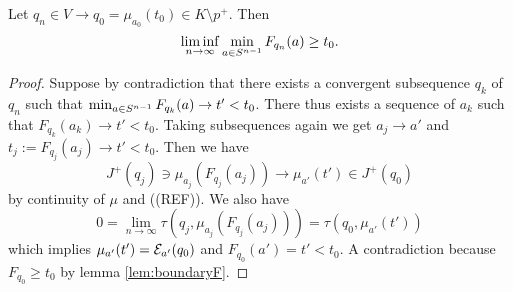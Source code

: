\begin{lemma}
    Let $q_n\in V\to q_0=\mu_{a_0}(t_0)\in K\setminus p^+$. Then 
    \[
        \liminf_{n\to \infty} \min_{a \in {S^{n-1}}} F_{q_n}(a) \ge t_0.
    \]
\end{lemma}
\begin{proof}
    Suppose by contradiction that there exists a convergent subsequence $q_k$ of $q_n$ such that $\min_{a \in {S^{n-1}}} F_{q_k}(a)\to t'<t_0$. There thus exists a sequence of $a_k$ such that $F_{q_k}(a_k)\to t'<t_0$. Taking subsequences again we get $a_j\to a'$ and $t_j:=F_{q_j}(a_j)\to t'<t_0$. Then we have 
    \[
        J^+(q_j)\ni \mu_{a_j}(F_{q_j}(a_j)) \to \mu_{a'}(t') \in J^+(q_0)
    \] by continuity of $\mu$ and ((REF)). We also have 
    \[
        0 = \lim_{n\to \infty}\tau(q_j,\mu_{a_j}(F_{q_j}(a_j))) = \tau(q_0,\mu_{a'}(t'))
    \] which implies $\mu_{a'}(t')={\mathcal{E}}_{a'}(q_0)$ and $F_{q_0}(a')=t'<t_0$. A contradiction because $F_{q_0}\ge t_0$ by lemma \ref{lem:boundaryF}.
\end{proof}

